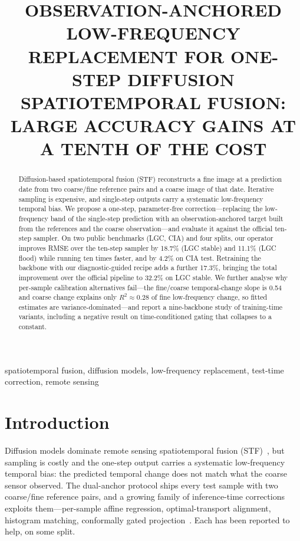 \documentclass{article}
\title{OBSERVATION-ANCHORED LOW-FREQUENCY REPLACEMENT FOR ONE-STEP DIFFUSION SPATIOTEMPORAL FUSION: LARGE ACCURACY GAINS AT A TENTH OF THE COST}
\begin{document}
\ninept
\maketitle

\begin{abstract}
Diffusion-based spatiotemporal fusion (STF) reconstructs a fine image at a prediction date from two coarse/fine reference pairs and a coarse image of that date. Iterative sampling is expensive, and single-step outputs carry a systematic low-frequency temporal bias. We propose a one-step, parameter-free correction---replacing the low-frequency band of the single-step prediction with an observation-anchored target built from the references and the coarse observation---and evaluate it against the official ten-step sampler. On two public benchmarks (LGC, CIA) and four splits, our operator improves RMSE over the ten-step sampler by 18.7\% (LGC stable) and 11.1\% (LGC flood) while running ten times faster, and by 4.2\% on CIA test. Retraining the backbone with our diagnostic-guided recipe adds a further 17.3\%, bringing the total improvement over the official pipeline to 32.2\% on LGC stable. We further analyse why per-sample calibration alternatives fail---the fine/coarse temporal-change slope is 0.54 and coarse change explains only $R^2\approx0.28$ of fine low-frequency change, so fitted estimates are variance-dominated---and report a nine-backbone study of training-time variants, including a negative result on time-conditioned gating that collapses to a constant.
\end{abstract}

\begin{keywords}
spatiotemporal fusion, diffusion models, low-frequency replacement, test-time correction, remote sensing
\end{keywords}

\section{Introduction}
\label{sec:intro}

Diffusion models dominate remote sensing spatiotemporal fusion (STF)~\cite{huang2024stfdiff,zhang2026sastf,zhu2026dpdiff}, but sampling is costly and the one-step output carries a systematic low-frequency temporal bias: the predicted temporal change does not match what the coarse sensor observed. The dual-anchor protocol ships every test sample with two coarse/fine reference pairs, and a growing family of inference-time corrections exploits them---per-sample affine regression, optimal-transport alignment, histogram matching, conformally gated projection~\cite{conformal2026}. Each has been reported to help, on some split.
\end{document}
